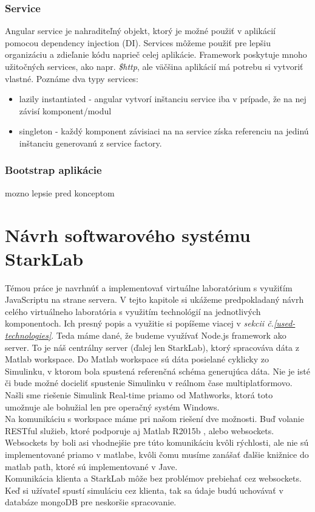 \subsubsection{Service}
Angular service je nahraditeľný objekt, ktorý je možné použiť v aplikácií pomocou dependency injection (DI). Services môžeme použiť pre lepšiu organizáciu a zdieľanie kódu naprieč celej aplikácie. Framework poskytuje mnoho užitočných services, ako napr. \textit{\$http}, ale väčšina aplikácií má potrebu si vytvoriť vlastné.
Poznáme dva typy services:
\begin{itemize}
\item lazily instantiated - angular vytvorí inštanciu service iba v prípade, že na nej závisí komponent/modul
\item singleton - každý komponent závisiaci na na service získa referenciu na jedinú inštanciu generovanú z service factory.
\end{itemize}

\subsubsection{Bootstrap aplikácie}
mozno lepsie pred konceptom


\section{Návrh softwarového systému StarkLab}
\indent Témou práce je navrhnúť a implementovať virtuálne laboratórium s využiťím JavaScriptu na strane servera. V tejto kapitole si ukážeme predpokladaný návrh celého virtuálneho laboratória s využitím technológií na jednotlivých komponentoch. Ich presný popis a využitie si popíšeme viacej v \textit{sekcii č.\ref{used-technologies}}. Teda máme dané, že budeme využívať Node.js framework ako server. To je náš centrálny server (ďalej len StarkLab), ktorý spracováva dáta z Matlab workspace. Do Matlab workspace sú dáta posielané cyklicky zo Simulinku, v ktorom bola spustená referenčná schéma generujúca dáta. Nie je isté či bude možné docieliť spustenie Simulinku v reálnom čase multiplatformovo. Našli sme riešenie Simulink Real-time priamo od Mathworks, ktorá toto umožnuje ale bohužial len pre operačný systém Windows.\\
Na komunikáciu s workspace máme pri našom riešení dve možnosti. Buď volanie RESTful služieb, ktoré podporuje aj Matlab R2015b \cite{matlab-restful}, alebo websockets. Websockets by boli asi vhodnejšie pre túto komunikáciu kvôli rýchlosti, ale nie sú implementované priamo v matlabe, kvôli čomu musíme zanášať ďalšie knižnice do matlab path, ktoré sú implementované v Jave.\\
Komunikácia klienta a StarkLab môže bez problémov prebiehať cez websockets. Keď si užívateľ spustí simuláciu cez klienta, tak sa údaje budú uchovávať v databáze mongoDB pre neskoršie spracovanie.

